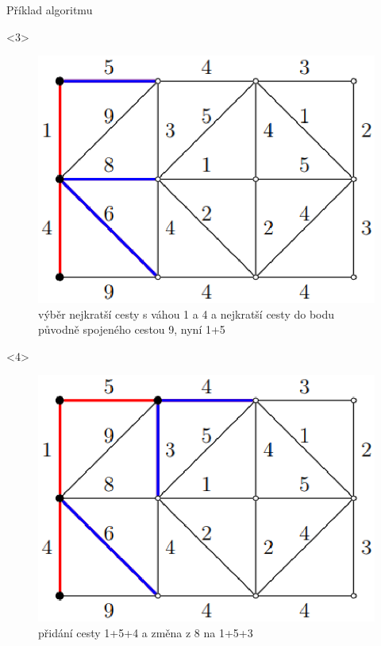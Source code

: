 \documentclass[pdf]{beamer}
\begin{document}
\begin{centering}
\begin{frame}{Příklad algoritmu}
    \begin{onlyenv}<3>
        \begin{figure}[h!]
        \includegraphics[scale=0.5]{obr3.eps}
        \caption{\label{fig:obr}výběr nejkratší cesty s váhou 1 a 4 a nejkratší cesty do bodu původně spojeného cestou 9, nyní 1+5}
        \end{figure}
    \end{onlyenv}
    
    \begin{onlyenv}<4>
        \begin{figure}[h!]
        \includegraphics[scale=0.5]{obr4.eps}
        \caption{\label{fig:obr4}přidání cesty 1+5+4 a změna z 8 na 1+5+3}
        \end{figure}
    \end{onlyenv}
    

\end{frame}
\end{centering}
\end{document}
